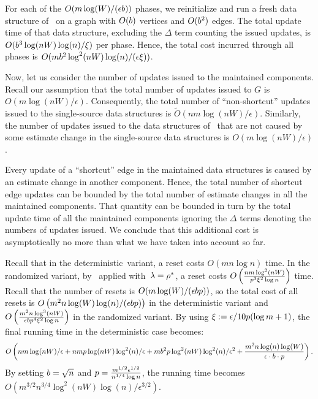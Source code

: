 \documentclass[11pt,letterpaper]{article}
\theoremstyle{plain}
\renewcommand{\O}{O}
\newcommand{\Ot}{\ensuremath{\widetilde{\O}}}
\newcommand{\eps}{\ensuremath{\epsilon}}
\begin{document}
For each of the $\O(m\log(W)/(\eps\phlen))$ phases, we reinitialize and run a fresh data structure of~
on a graph with $\O(\phlen)$ vertices and $\O(\phlen^2)$ edges.
The total update time of that data structure, excluding the $\Delta$ term counting the issued updates, is $\O(\phlen^3\log(nW)\log(n)/\epsp)$ per phase.
Hence, the total cost incurred through all phases is $\O(m\phlen^2\log^2(nW)\log(n)/(\eps\epsp))$.

Now, let us consider the number of updates issued to the maintained components.
Recall our assumption that the total number of updates issued to $G$ is $\O(m\log(nW)/\eps)$.
Consequently, the total number of ``non-shortcut'' updates issued to the single-source data structures is $\Ot(nm\log(nW)/\eps)$.
Similarly, the number of updates issued to the data structures of~ that are not caused by some estimate change in the single-source data structures is $\O(m\log(nW)/\eps)$.

Every update of a ``shortcut'' edge in the maintained data structures is caused by an estimate change in another component.
Hence, the total number of shortcut edge updates can be bounded by the total number of estimate changes in all the maintained components. 
That quantity can be bounded in turn by the total update time of all the maintained components ignoring the $\Delta$ terms denoting the numbers of
updates issued.
We conclude that this additional cost is asymptotically no more than what we have taken into account so far.

Recall that in the deterministic~variant, a reset costs $\O(mn\log{n})$ time.
In the randomized variant, by~ applied with~${\lambda=\rho^*}$, a reset costs $\O\left(\frac{nm\log^2(nW)}{\reset^3\epsp^2\log{n}}\right)$ time.
Recall that the number of resets is $\O(m\log(W)/(\eps\phlen\reset))$,
so the total cost of all resets is $\O\left(m^2n\log(W)\log(n)/(\eps\phlen\reset)\right)$
in the deterministic variant and $\O\left(\frac{m^2n\log^3(nW)}{\eps\phlen\reset^4\epsp^2\log{n}}\right)$
in the randomized variant.
By using \linebreak ${\epsp:=\eps/10\reset(\log{m}+1)}$, the final running time in the deterministic case becomes:
\[ \O\left(nm\log(nW)/\eps+nm\reset\log(nW)\log^2(n)/\eps+m\phlen^2\reset\log^2(nW)\log^2(n)/\eps^2+\frac{m^2n\log(n)\log(W)}{\eps\cdot \phlen\cdot \reset}\right). \]
By setting $b=\sqrt{n}$ and $\reset=\frac{m^{1/2}\eps^{1/2}}{n^{1/4}\log{n}}$, the running
time becomes $\O(m^{3/2}n^{3/4}\log^2(nW)\log(n)/\eps^{3/2})$.
\end{document}
